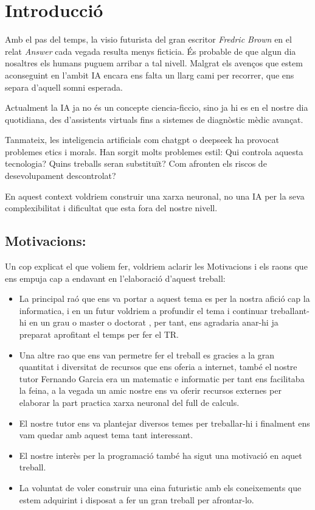\chapter{Introducció}
\label{c:intro}

Amb el pas del temps, la visio futurista del gran escritor \textit{Fredric Brown} en el relat \emph{Answer} cada vegada resulta menys ficticia. És probable de que algun dia nosaltres els humans puguem arribar a tal nivell. Malgrat els avenços que estem aconseguint en l'ambit IA encara ens falta un llarg cami per recorrer, que ens separa d'aquell somni esperada.

Actualment la IA ja no és un concepte ciencia-ficcio, sino ja hi es en el nostre dia quotidiana, des d’assistents virtuals fins a sistemes de diagnòstic mèdic avançat.

Tanmateix, les inteligencia artificials com chatgpt o deepseek ha provocat problemes etics i morals. Han sorgit molts problemes estil: Qui controla aquesta tecnologia? Quins treballs seran substituït? Com afronten els riscos de desevolupament descontrolat?

En aquest context voldriem construir una xarxa neuronal, no una IA per la seva complexibilitat i dificultat que esta fora del nostre nivell.

\section{Motivacions:}
Un cop explicat el que voliem fer, voldriem aclarir les Motivacions i els raons que ens empuja cap a endavant en l'elaboració d'aquest treball:

\begin{itemize}
 \item La principal raó que ens va portar a aquest tema es per la nostra afició cap la informatica, i en un futur voldriem a profundir el tema i continuar treballant-hi en un grau o master o doctorat , per tant, ens agradaria anar-hi ja preparat aprofitant el temps per fer el TR.

 \item Una altre rao que ens van permetre fer el treball es gracies a la gran quantitat i diversitat de  recursos que ens oferia a internet, també el nostre tutor Fernando Garcia era un matematic e informatic per tant ens facilitaba la feina, a la vegada un amic nostre ens va oferir recursos externes per elaborar la part practica xarxa neuronal del full de calculs.

 \item El nostre tutor ens va plantejar diversos temes per treballar-hi i finalment ens vam quedar amb aquest tema tant interessant.

 \item El nostre interès per la programació també ha sigut una motivació en aquet treball.

 \item La voluntat de voler construir una eina futuristic amb els coneixements que estem adquirint i disposat a fer un gran treball per afrontar-lo.

\end{itemize}


